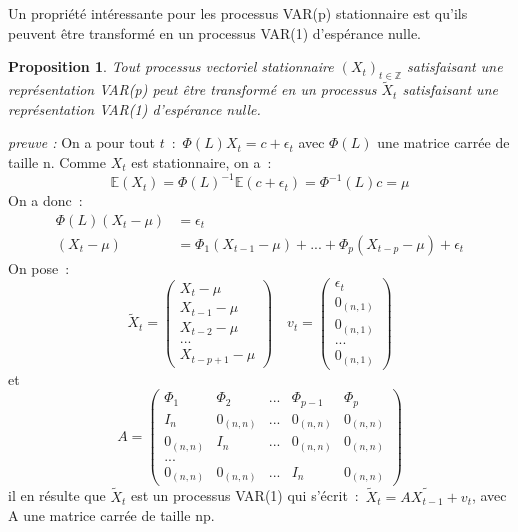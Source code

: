 \documentclass[11pt]{scrartcl} %
\newtheorem{pro}[theorem]{Proposition}
\newcommand{\Xt}{\left(X_t\right)_{t\in\mathbb{Z}}}
\newcommand{\E}[1]{\mathbb{E}\left(#1\right)}
\begin{document}
Un propriété intéressante pour les processus VAR(p) stationnaire est qu'ils peuvent être transformé en un processus VAR(1) d'espérance nulle.
\begin{pro}
Tout processus vectoriel stationnaire $\Xt$ satisfaisant une représentation VAR(p) peut être transformé en un processus $\tilde{X}_t$ satisfaisant une représentation VAR(1) d'espérance nulle.
\end{pro}
\textit{preuve : }
\newline
On a pour tout $t$~:~$\Phi(L)X_t = c + \epsilon_t$ avec $\Phi(L)$ une matrice carrée de taille n. Comme $X_t$ est stationnaire, on a~:
$$
\E{X_t}=\Phi(L)^{-1}\E{c+\epsilon_t}=\Phi^{-1}(L)c=\mu
$$
On a donc~:
\begin{align*}
\Phi(L)(X_t-\mu) & = \epsilon_t\\
(X_t-\mu) & = \Phi_1(X_{t-1}-\mu)+...+\Phi_p(X_{t-p}-\mu)+\epsilon_t
\end{align*}
On pose~:
$$
\tilde{X}_t = \left(
\begin{array}{c}
X_t-\mu \\
X_{t-1}-\mu \\
X_{t-2}-\mu \\
...\\
X_{t-p+1}-\mu 
\end{array}
\right)
\quad
v_t = \left(
\begin{array}{c}
\epsilon_t \\
0_{(n,1)} \\
0_{(n,1)} \\
...\\
0_{(n,1)} 
\end{array}
\right)
$$
et 
$$
A = \left(
\begin{array}{ccccc}
\Phi_1 & \Phi_2 & ... & \Phi_{p-1} & \Phi_p \\
I_n & 0_{(n,n)} & ... & 0_{(n,n)} & 0_{(n,n)} \\
0_{(n,n)}& I_n & ... & 0_{(n,n)} & 0_{(n,n)} \\
...\\
0_{(n,n)}& 0_{(n,n)} & ... &  I_n& 0_{(n,n)} 
\end{array}
\right)
$$
il en résulte que $\tilde{X}_t$ est un processus VAR(1) qui s'écrit~:~$\tilde{X}_t = A\tilde{X_{t-1}}+v_t$, avec A une matrice carrée de taille np.
\end{document}

